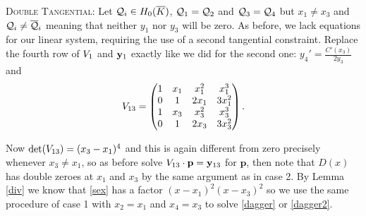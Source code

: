 \documentclass[english,11pt,a4paper]{article}
\begin{document}
\begin{case}
	{\scshape Double Tangential:} Let $\mathcal{Q}_i \in H_0(\overline K)$, $\mathcal{Q}_1 = \mathcal{Q}_2$ and $\mathcal{Q}_3 = \mathcal{Q}_4$ but $x_1 \neq x_3$ and $\mathcal{Q}_i \neq \overline {\mathcal{Q}}_i$ meaning that neither $y_1$ nor $y_3$ will be zero. As before, we lack equations for our linear system, requiring the use of a second tangential constraint. Replace the fourth row of $V_1$ and $\mathbf{y}_1$ exactly like we did for the second one: $y_4'=\frac{C'(x_3)}{2 y_3}$ and
	\begin{align*}V_{13}=
		\begin{pmatrix}
			1 & x_1 & x_1^2 & x_1^3\\
			0 & 1 & 2 x_1 & 3 x_1^2\\
			1 & x_3 & x_3^2 & x_3^3\\
			0 & 1 & 2 x_3 & 3 x_3^2\\
		\end{pmatrix}.
	\end{align*}

	Now $\det(V_{13})=(x_3-x_1)^4$ and this is again different from zero precisely whenever $x_3 \neq x_1$, so as before solve $V_{13} \cdot \mathbf{p} = \mathbf{y}_{13}$ for $\mathbf{p}$, then note that $D(x)$ has double zeroes at $x_1$ and $x_3$ by the same argument as in case 2.
	By Lemma \ref{div} we know that \eqref{sex} has a factor $(x-x_1)^2(x-x_3)^2$ so we use the same procedure of case 1 with $x_2 = x_1$ and $x_4 = x_3$ to solve \eqref{dagger} or \eqref{dagger2}.
\end{case}
\end{document}
